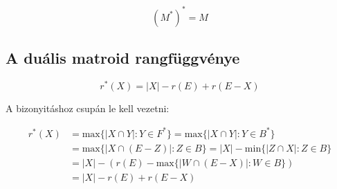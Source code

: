 \[(M^*)^* = M \]

\subsection{A duális matroid rangfüggvénye}

\[ r^*(X) = |X|-r(E)+r(E-X)\]

A bizonyitáshoz csupán le kell vezetni:

\begin{align*}
r^*(X) &= \mbox{max} \{ |X \cap Y| : Y \in F^*\}   = \mbox{max} \{ |X \cap Y| : Y \in B^*\}\\
       &= \mbox{max} \{ |X \cap (E-Z)| : Z \in B\} = |X| - \mbox{min} \{ |Z \cap X| : Z \in B\}\\
       &= |X| - (r(E)-\mbox{max}\{|W \cap (E-X)| : W \in B\}) \\
       &= |X| - r(E) + r(E-X)
\end{align*}